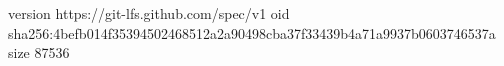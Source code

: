 version https://git-lfs.github.com/spec/v1
oid sha256:4befb014f35394502468512a2a90498cba37f33439b4a71a9937b0603746537a
size 87536
